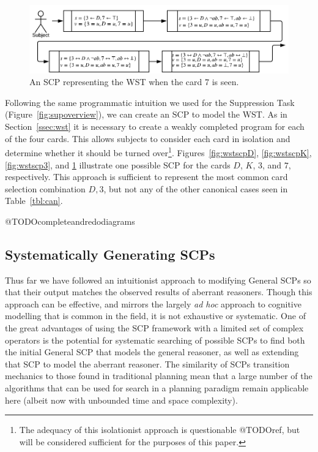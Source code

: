 \documentclass{article}
\begin{document}
\begin{figure}
\begin{center}
 \centering \includegraphics[scale=0.75]{WSTSCP7}
\caption{An SCP representing the WST when the card 7 is seen. }
\label {fig:wstscp7}
\end{center}
\end{figure}



Following the same programmatic intuition we used for the Suppression Task (Figure~\ref{fig:supoverview}), we can create an SCP to model the WST. As in Section~\ref{ssec:wst} it is necessary to create a weakly completed program for each of the four cards. This allows subjects to consider each card in isolation and determine whether it should be turned over\footnote{The adequacy of this isolationist approach is questionable @TODOref, but will be considered sufficient for the purposes of this paper.}. Figures~\ref{fig:wstscpD}, \ref{fig:wstscpK}, \ref{fig:wstscp3}, and \ref{fig:wstscp7} illustrate one possible SCP for the cards $D$, $K$, $3$, and $7$, respectively. This approach is sufficient to represent the most common card selection combination $D,3$, but not any of the other canonical cases seen in Table~\ref{tbl:can}.

@TODOcompleteandredodiagrams


\subsection{Systematically Generating SCPs}

Thus far we have followed an intuitionist approach to modifying General SCPs so that their output matches the observed results of aberrant reasoners. Though this approach can be effective, and mirrors the largely \textit{ad hoc} approach to cognitive modelling that is common in the field, it is not exhaustive or systematic. One of the great advantages of using the SCP framework with a limited set of complex operators is the potential for systematic searching of possible SCPs to find both the initial General SCP that models the general reasoner, as well as extending that SCP to model the aberrant reasoner. The similarity of SCPs transition mechanics to those found in traditional planning mean that a large number of the algorithms that can be used for search in a planning paradigm remain applicable here (albeit now with unbounded time and space complexity).
\end{document}
